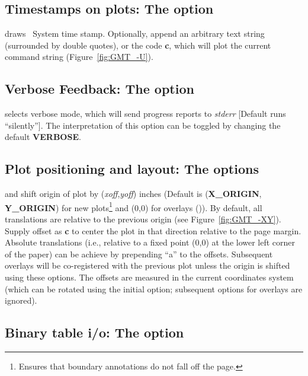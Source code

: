 \subsection{Timestamps on plots: The  option} 

 draws \UNIX\ System time stamp.  Optionally, append an arbitrary
text string (surrounded by double quotes), or the code {\bf c}, which will
plot the current command string (Figure~\ref{fig:GMT_-U}).


\subsection{Verbose Feedback: The  option} 
\label{sec:verbose}
 selects verbose mode, which will send progress reports to
\emph{stderr} [Default runs ``silently''].  The interpretation of
this option can be toggled by changing the default {\bf VERBOSE}.

\subsection{Plot positioning and layout: The   options}

 and  shift origin of plot by ({\it xoff},{\it yoff})
inches (Default is ({\bf X\_ORIGIN}, {\bf Y\_ORIGIN}) for new plots\footnote{Ensures that
boundary annotations do not fall off the page.} and (0,0) for overlays ()).
By default, all translations are relative to the previous origin
(see Figure~\ref{fig:GMT_-XY}).  Supply offset as {\bf c} to center the
plot in that direction relative to the page margin.
Absolute translations (i.e., relative to a fixed point (0,0) at the
lower left corner of the paper) can be achieve by prepending ``a''
to the offsets.  Subsequent overlays will be co-registered with the
previous plot unless the origin is shifted using these options.
The offsets are measured in the current coordinates system (which can
be rotated using the initial  option; subsequent  options
for overlays are ignored).


\subsection{Binary table i/o: The  option}

